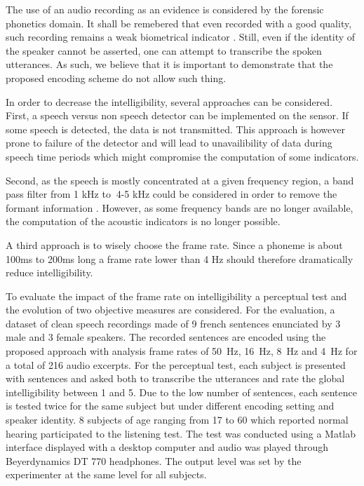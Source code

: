 \documentclass[final,3p,times,twocolumn]{elsarticle}
\begin{document}
The use of an audio recording as an evidence is considered by the forensic phonetics \cite{baldwin1990forensic} domain. It shall be remebered that even recorded with a good quality, such recording remains a weak biometrical indicator \cite{boe2000forensic}. Still, even if the identity of the speaker cannot be asserted, one can attempt to transcribe the spoken utterances. As such, we believe that it is important to demonstrate that the proposed encoding scheme do not allow such thing.

In order to decrease the intelligibility, several approaches can be considered. First,  a speech versus non speech detector can be implemented on the sensor. If some speech is detected, the data is not transmitted. This approach is however prone to failure of the detector and will lead to unavailibility of data during speech time periods which might compromise the computation of some indicators.

Second, as the speech is mostly concentrated at a given frequency region, a band pass filter from 1 kHz to $~$4-5 kHz could be considered in order to remove the formant information \cite{kent1992acoustic}. However, as some frequency bands are no longer available, the computation of the acoustic indicators is no longer possible.

A third approach is to wisely choose the frame rate. Since a phoneme is about 100ms to 200ms long \cite{kuwabara1996acoustic} \cite{rosen1992temporal} a frame rate lower than 4 Hz should therefore dramatically reduce intelligibility.





To evaluate the impact of the frame rate on intelligibility a perceptual test and the evolution of two objective measures are considered. For the evaluation, a dataset of clean speech recordings made of 9 french sentences enunciated by 3 male and 3 female speakers. The recorded sentences are encoded using the proposed approach with analysis frame rates of 50~Hz, 16~Hz, 8~Hz and 4~Hz for a total of 216 audio excerpts. For the perceptual test, each subject is presented with sentences and asked both to transcribe the utterances and rate the global intelligibility between 1 and 5. Due to the low number of sentences, each sentence is tested twice for the same subject but under different encoding setting and speaker identity. 8 subjects of age ranging from 17 to 60 which reported normal hearing  participated to the listening test. The test was conducted using a Matlab interface displayed with a desktop computer and audio was played through Beyerdynamics DT 770 headphones. The output level was set by the experimenter at the same level for all subjects.
\end{document}
